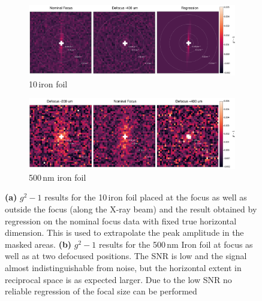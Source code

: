 \begin{figure}
	\centering
	\begin{subfigure}[b]{0.9\textwidth}
		\includegraphics[width=\linewidth]{images/Fe10um_reco2d.pdf}
		\caption{10\,\micrometer iron foil}
		\label{fig:fe10umreco2d}
	\end{subfigure}
	\begin{subfigure}[b]{0.9\textwidth}
		\includegraphics[width=\linewidth]{images/Fe500nm_reco2d.pdf}
		\caption{500\,nm iron foil}
		\label{fig:fe500nmreco2d}
	\end{subfigure}
	\caption[Results iron foils]{\textbf{(a)} $g^2-1$ results for the 10\,\micrometer iron foil placed at the focus as well as outside the focus (along the X-ray beam) and the result obtained by regression on the nominal focus data with fixed true horizontal dimension. This is used to extrapolate the peak amplitude in the masked areas. \textbf{(b)} $g^2-1$ results for the 500\,nm Iron foil at focus as well as at two defocused positions. The SNR is low and the signal almost indistinguishable from noise, but the horizontal extent in reciprocal space is as expected larger. Due to the low SNR no reliable regression of the focal size can be performed}
	\label{fig:fereco2d}
\end{figure}
